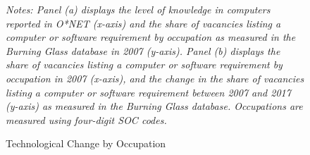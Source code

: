 \documentclass[12pt]{article}
\begin{document}
{\begin{figure}[!tph]
	\caption{Technological Change by Occupation \label{fig:Technology Adoption by firms}}
	\begin{centering}
		\par\end{centering}
	\emph{Notes: Panel (a) displays the level of knowledge in computers reported in O{*}NET (x-axis) and the share of vacancies listing a computer or software requirement by occupation as measured in the Burning Glass database in 2007 (y-axis). Panel (b) displays the share of vacancies listing a computer or software requirement by occupation in 2007 (x-axis), and the change in the share of vacancies listing a computer or software requirement between 2007 and 2017 (y-axis) as measured in the Burning Glass database. Occupations are measured using four-digit SOC codes.}\\	
\end{figure}
		
}
\end{document}
